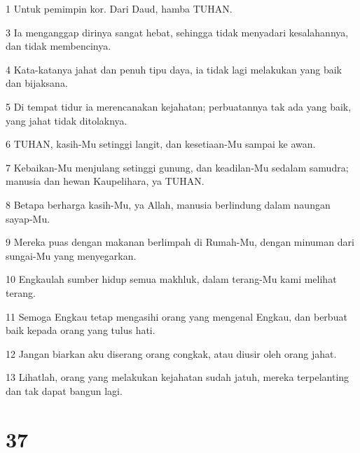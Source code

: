 \par 1 Untuk pemimpin kor. Dari Daud, hamba TUHAN.
\par 3 Ia menganggap dirinya sangat hebat, sehingga tidak menyadari kesalahannya, dan tidak membencinya.
\par 4 Kata-katanya jahat dan penuh tipu daya, ia tidak lagi melakukan yang baik dan bijaksana.
\par 5 Di tempat tidur ia merencanakan kejahatan; perbuatannya tak ada yang baik, yang jahat tidak ditolaknya.
\par 6 TUHAN, kasih-Mu setinggi langit, dan kesetiaan-Mu sampai ke awan.
\par 7 Kebaikan-Mu menjulang setinggi gunung, dan keadilan-Mu sedalam samudra; manusia dan hewan Kaupelihara, ya TUHAN.
\par 8 Betapa berharga kasih-Mu, ya Allah, manusia berlindung dalam naungan sayap-Mu.
\par 9 Mereka puas dengan makanan berlimpah di Rumah-Mu, dengan minuman dari sungai-Mu yang menyegarkan.
\par 10 Engkaulah sumber hidup semua makhluk, dalam terang-Mu kami melihat terang.
\par 11 Semoga Engkau tetap mengasihi orang yang mengenal Engkau, dan berbuat baik kepada orang yang tulus hati.
\par 12 Jangan biarkan aku diserang orang congkak, atau diusir oleh orang jahat.
\par 13 Lihatlah, orang yang melakukan kejahatan sudah jatuh, mereka terpelanting dan tak dapat bangun lagi.

\chapter{37}

